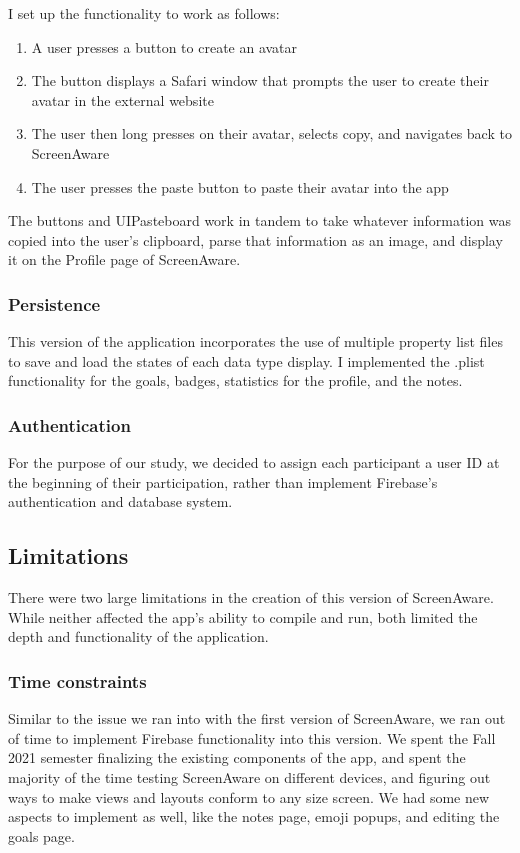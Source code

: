 \documentclass[12pt, title page, manuscript, nonacm]{acmart}
\begin{document}
\par I set up the functionality to work as follows: 
\begin{enumerate}
    \item A user presses a button to create an avatar
    \item The button displays a Safari window that prompts the user to create their avatar in the external website
    \item The user then long presses on their avatar, selects copy, and navigates back to ScreenAware
    \item The user presses the paste button to paste their avatar into the app
\end{enumerate}
The buttons and UIPasteboard work in tandem to take whatever information was copied into the user's clipboard, parse that information as an image, and display it on the Profile page of ScreenAware.
\subsubsection*{Persistence}
This version of the application incorporates the use of multiple property list files to save and load the states of each data type display. I implemented the .plist functionality for the goals, badges, statistics for the profile, and the notes.
\subsubsection*{Authentication}
For the purpose of our study, we decided to assign each participant a user ID at the beginning of their participation, rather than implement Firebase's authentication and database system.
\subsection*{Limitations}
There were two large limitations in the creation of this version of ScreenAware. While neither affected the app's ability to compile and run, both limited the depth and functionality of the application.
\subsubsection*{Time constraints}
Similar to the issue we ran into with the first version of ScreenAware, we ran out of time to implement Firebase functionality into this version. We spent the Fall 2021 semester finalizing the existing components of the app, and spent the majority of the time testing ScreenAware on different devices, and figuring out ways to make views and layouts conform to any size screen. We had some new aspects to implement as well, like the notes page, emoji popups, and editing the goals page.
\end{document}

